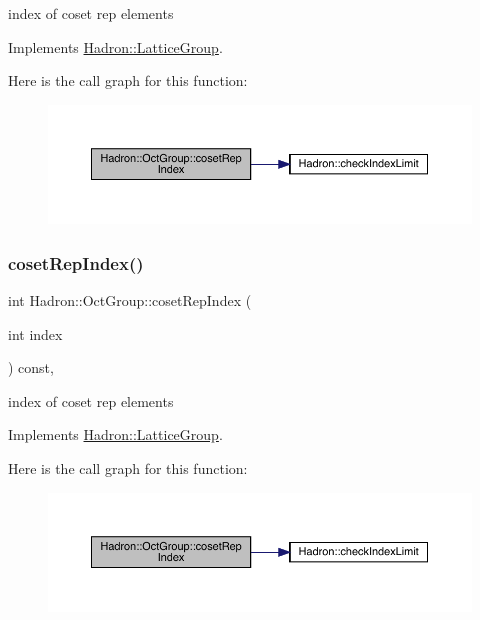 index of coset rep elements 

Implements \mbox{\hyperlink{structHadron_1_1LatticeGroup_a7e3b9b5e2f596e6c40d64aa939a3ad6c}{Hadron\+::\+Lattice\+Group}}.

Here is the call graph for this function\+:
\nopagebreak
\begin{figure}[H]
\begin{center}
\leavevmode
\includegraphics[width=350pt]{d1/de5/structHadron_1_1OctGroup_aeaabc93ad3df1b585bc1009b0bf4f5ba_cgraph}
\end{center}
\end{figure}
\mbox{\label{structHadron_1_1OctGroup_aeaabc93ad3df1b585bc1009b0bf4f5ba}} 
\subsubsection{\texorpdfstring{cosetRepIndex()}{cosetRepIndex()}\hspace{0.1cm}{\footnotesize\ttfamily [3/3]}}
{\footnotesize\ttfamily int Hadron\+::\+Oct\+Group\+::coset\+Rep\+Index (\begin{DoxyParamCaption}\item[{int}]{index }\end{DoxyParamCaption}) const\hspace{0.3cm}{\ttfamily [inline]}, {\ttfamily [virtual]}}

index of coset rep elements 

Implements \mbox{\hyperlink{structHadron_1_1LatticeGroup_a7e3b9b5e2f596e6c40d64aa939a3ad6c}{Hadron\+::\+Lattice\+Group}}.

Here is the call graph for this function\+:
\nopagebreak
\begin{figure}[H]
\begin{center}
\leavevmode
\includegraphics[width=350pt]{d1/de5/structHadron_1_1OctGroup_aeaabc93ad3df1b585bc1009b0bf4f5ba_cgraph}
\end{center}
\end{figure}
\mbox{\label{structHadron_1_1OctGroup_a1db49add38b9263bfd536b3da0cc1566}} 
